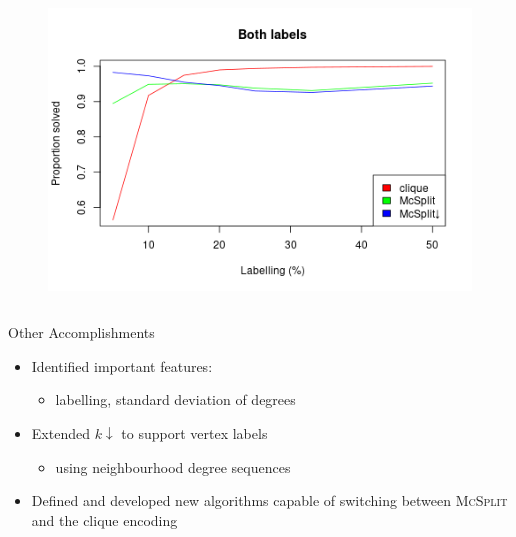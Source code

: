 \documentclass{beamer}
\begin{document}
\begin{frame}
\begin{columns}
\begin{column}{0.5\textwidth}
\begin{figure}
        \includegraphics[width=\textwidth]{../dissertation/images/both_labels_linechart.png}
      \end{figure}
    \end{column}
  \end{columns}
\end{frame}

\begin{frame}{Other Accomplishments}
  \begin{itemize}
  \item Identified important features:
    \begin{itemize}
    \item labelling, standard deviation of degrees
    \end{itemize}
  \item Extended $k{\downarrow}$ to support vertex labels
    \begin{itemize}
    \item using neighbourhood degree sequences
    \end{itemize}
  \item Defined and developed new algorithms capable of switching between
    \textsc{McSplit} and the clique encoding
  \end{itemize}
\end{frame}
\end{document}
